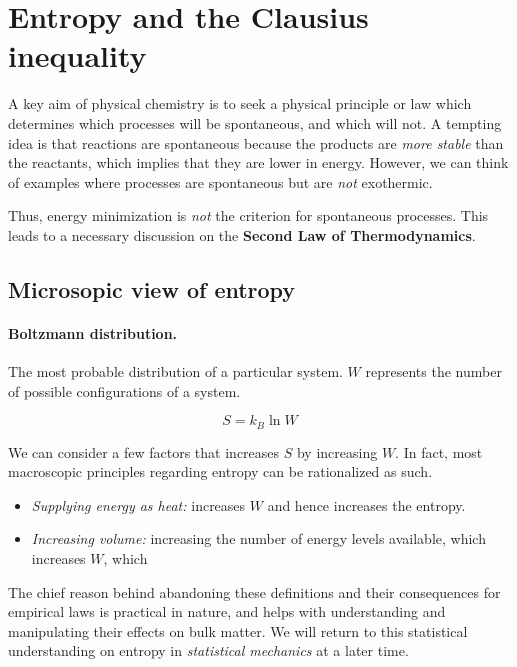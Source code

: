 \documentclass{article}
\numberwithin{theorem}{section}
\numberwithin{corollary}{section}
\numberwithin{postulate}{section}
\numberwithin{lemma}{section}
\numberwithin{definition}{section}
\begin{document}
\pagebreak

\section{Entropy and the Clausius inequality}

A key aim of physical chemistry is to seek a physical principle or law which
determines which processes will be spontaneous, and which will not. A tempting
idea is that reactions are spontaneous because the products are \textit{more
stable} than the reactants, which implies that they are lower in energy.
However, we can think of examples where processes are spontaneous but are
\textit{not} exothermic. 

Thus, energy minimization is \textit{not} the criterion for spontaneous
processes. This leads to a necessary discussion on the \textbf{Second Law of
Thermodynamics}.

\subsection{Microsopic view of entropy}

\paragraph{Boltzmann distribution. } The most probable distribution of a
particular system. $W$ represents the number of possible configurations of a
system.

\begin{equation}
  S = k_{B} \ln{W}
\end{equation}

We can consider a few factors that increases $S$ by increasing $W$. In fact, most
macroscopic principles regarding entropy can be rationalized as such.

\begin{itemize}
  \item \textit{Supplying energy as heat:} increases $W$ and hence increases the
    entropy.
  \item \textit{Increasing volume:} increasing the number of energy levels
    available, which increases $W$, which
\end{itemize}

The chief reason behind abandoning these definitions and their consequences for
empirical laws is practical in nature, and helps with understanding and
manipulating their effects on bulk matter. We will return to this statistical
understanding on entropy in \textit{statistical mechanics} at a later time.
\end{document}
